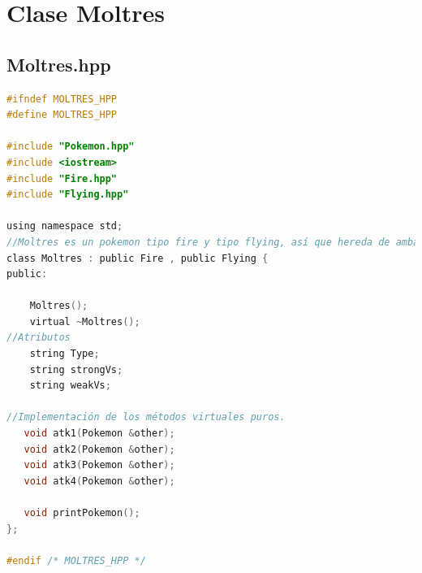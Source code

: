 \documentclass[11pt]{article}
\begin{document}
\section{Clase Moltres}
\subsection{Moltres.hpp}
\begin{lstlisting}[language=C]
#ifndef MOLTRES_HPP
#define MOLTRES_HPP

#include "Pokemon.hpp"
#include <iostream>
#include "Fire.hpp"
#include "Flying.hpp"

using namespace std;
//Moltres es un pokemon tipo fire y tipo flying, así que hereda de ambas clases. 
class Moltres : public Fire , public Flying {
public:

    Moltres();
    virtual ~Moltres();
//Atributos
    string Type; 
    string strongVs;
    string weakVs;

//Implementación de los métodos virtuales puros. 
   void atk1(Pokemon &other);
   void atk2(Pokemon &other);
   void atk3(Pokemon &other);
   void atk4(Pokemon &other);

   void printPokemon();
};

#endif /* MOLTRES_HPP */




\end{lstlisting}
\end{document}
